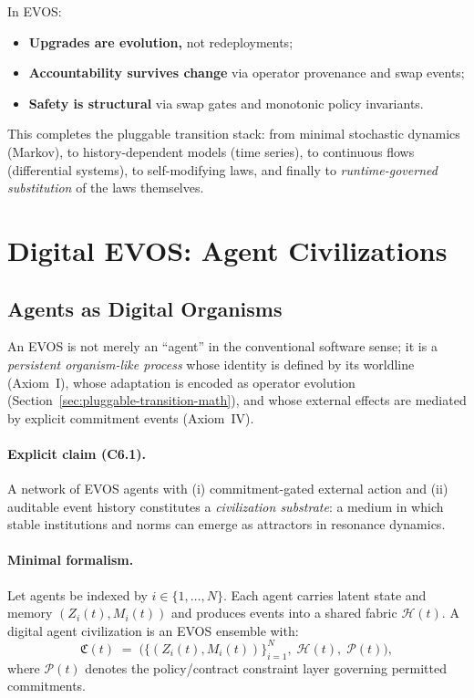 \documentclass[11pt]{article}
\begin{document}
In EVOS:
\begin{itemize}
  \item \textbf{Upgrades are evolution,} not redeployments;
  \item \textbf{Accountability survives change} via operator provenance and swap events;
  \item \textbf{Safety is structural} via swap gates and monotonic policy invariants.
\end{itemize}

This completes the pluggable transition stack: from minimal stochastic dynamics (Markov),
to history-dependent models (time series), to continuous flows (differential systems),
to self-modifying laws, and finally to \emph{runtime-governed substitution} of the laws themselves.


\vspace{3mm}

\section{Digital EVOS: Agent Civilizations}
\label{sec:digital-evos}

\subsection{Agents as Digital Organisms}
\label{sec:agents-as-organisms}

An EVOS is not merely an ``agent'' in the conventional software sense; it is a
\emph{persistent organism-like process} whose identity is defined by its worldline
(Axiom~I), whose adaptation is encoded as operator evolution (Section~\ref{sec:pluggable-transition-math}),
and whose external effects are mediated by explicit commitment events (Axiom~IV).

\paragraph{Explicit claim (C6.1).}
A network of EVOS agents with (i) commitment-gated external action and (ii) auditable
event history constitutes a \emph{civilization substrate}: a medium in which stable
institutions and norms can emerge as attractors in resonance dynamics.

\paragraph{Minimal formalism.}
Let agents be indexed by $i \in \{1,\dots,N\}$. Each agent carries latent state and
memory $(Z_i(t), M_i(t))$ and produces events into a shared fabric $\mathcal{H}(t)$.
A digital agent civilization is an EVOS ensemble with:
\[
\mathfrak{C}(t) \;=\; \big(\{(Z_i(t),M_i(t))\}_{i=1}^N,\;\mathcal{H}(t),\;\mathcal{P}(t)\big),
\]
where $\mathcal{P}(t)$ denotes the policy/contract constraint layer governing permitted commitments.
\end{document}
